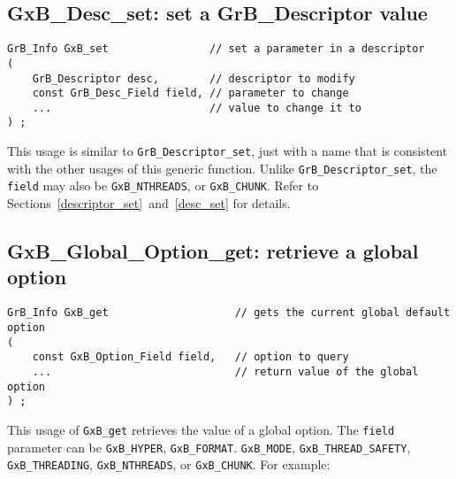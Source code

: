 \documentclass[12pt]{article}
\begin{document}
\subsection{{\sf GxB\_Desc\_set:} set a {\sf GrB\_Descriptor} value}
\label{gxbset}

\begin{mdframed}[userdefinedwidth=6in]
{\footnotesize
\begin{verbatim}
GrB_Info GxB_set                // set a parameter in a descriptor
(
    GrB_Descriptor desc,        // descriptor to modify
    const GrB_Desc_Field field, // parameter to change
    ...                         // value to change it to
) ;
\end{verbatim} } \end{mdframed}

This usage is similar to \verb'GrB_Descriptor_set', just with a name that is
consistent with the other usages of this generic function.  Unlike
\verb'GrB_Descriptor_set', the \verb'field' may also be \verb'GxB_NTHREADS', or
\verb'GxB_CHUNK'.  Refer to Sections~\ref{descriptor_set}~and~\ref{desc_set}
for details.

\subsection{{\sf GxB\_Global\_Option\_get:} retrieve a global option}
\label{gxbget}

\begin{mdframed}[userdefinedwidth=6in]
{\footnotesize
\begin{verbatim}
GrB_Info GxB_get                    // gets the current global default option
(
    const GxB_Option_Field field,   // option to query
    ...                             // return value of the global option
) ;
\end{verbatim} } \end{mdframed}

This usage of \verb'GxB_get' retrieves the value of a global option.  The
\verb'field' parameter can be \verb'GxB_HYPER', \verb'GxB_FORMAT'.
\verb'GxB_MODE', \verb'GxB_THREAD_SAFETY', \verb'GxB_THREADING',
\verb'GxB_NTHREADS', or \verb'GxB_CHUNK'.
For example:
\end{document}
